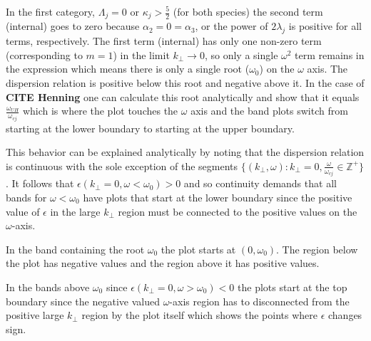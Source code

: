 \documentclass[12pt,a4paper]{article}
\begin{document}
    In the first category, $\Lambda_j = 0$ or $\kappa_j > \frac{5}{2}$ (for both species) the second term (internal) goes to zero because $\alpha_2 = 0 = \alpha_3$, or the power of $2 \lambda_j$ is positive for all terms, respectively.
    The first term (internal) has only one non-zero term (corresponding to $m = 1$) in the limit $k_\perp \rightarrow 0$, so only a single $\omega^2$ term remains in the expression which means there is only a single root ($\omega_0$) on the $\omega$ axis.
    The dispersion relation is positive below this root and negative above it.
    In the case of \textbf{CITE Henning} one can calculate this root analytically and show that it equals $\frac{\omega_{UH}}{\omega_{cj}}$ which is where the plot touches the $\omega$ axis and the band plots switch from starting at the lower boundary to starting at the upper boundary.

    This behavior can be explained analytically by noting that the dispersion relation is continuous with the sole exception of the segments $\{(k_\perp, \omega): k_\perp = 0, \frac{\omega}{\omega_{cj}} \in \mathbb{Z}^+\}$.
    It follows that $\epsilon(k_\perp = 0, \omega < \omega_0) > 0$ and so continuity demands that all bands for $\omega < \omega_0$ have plots that start at the lower boundary since the positive value of $\epsilon$ in the large $k_\perp$ region must be connected to the positive values on the $\omega$-axis.

    In the band containing the root $\omega_0$ the plot starts at $(0, \omega_0)$. The region below the plot has negative values and the region above it has positive values.

    In the bands above $\omega_0$ since $\epsilon(k_\perp = 0, \omega > \omega_0) < 0$ the plots start at the top boundary since the negative valued $\omega$-axis region has to disconnected from the positive large $k_\perp$ region by the plot itself which shows the points where $\epsilon$ changes sign.
\end{document}
